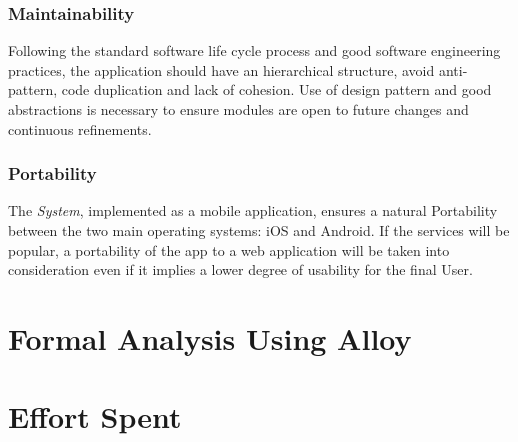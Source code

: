 \documentclass {article}
\begin{document}
	\subsubsection{Maintainability}
	Following the standard software life cycle process and good software engineering practices, the application should have an hierarchical structure, avoid anti-pattern, code duplication and lack of cohesion. Use of design pattern and good abstractions is necessary to ensure modules are open to future changes and continuous refinements. 
	\subsubsection{Portability}
	The {\it System}, implemented as a mobile application, ensures a natural Portability between the two main operating systems: iOS and Android. If the services will be popular, a portability of the app to a web application will be taken into consideration even if it implies a lower degree of usability for the final User.
	
\pagebreak


\section{Formal Analysis Using Alloy}

\section{Effort Spent}

\pagebreak

	
\end{document}
